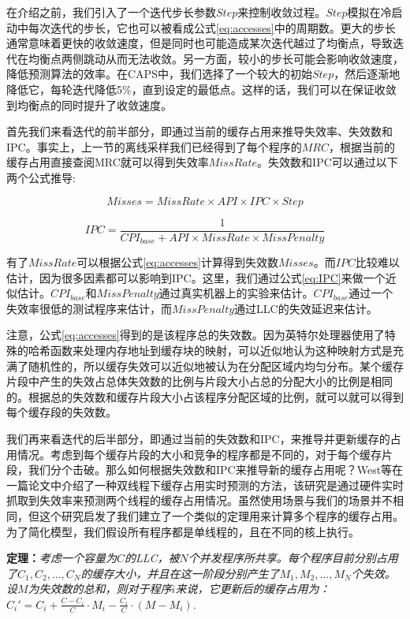 在介绍之前，我们引入了一个迭代步长参数$Step$来控制收敛过程。$Step$模拟在冷启动中每次迭代的步长，它也可以被看成公式\ref{eq:accesses}中的周期数。更大的步长通常意味着更快的收敛速度，但是同时也可能造成某次迭代越过了均衡点，导致迭代在均衡点两侧跳动从而无法收敛。另一方面，较小的步长可能会影响收敛速度，降低预测算法的效率。在CAPS中，我们选择了一个较大的初始$Step$，然后逐渐地降低它，每轮迭代降低5\%，直到设定的最低点。这样的话，我们可以在保证收敛到均衡点的同时提升了收敛速度。

首先我们来看迭代的前半部分，即通过当前的缓存占用来推导失效率、失效数和IPC。事实上，上一节的离线采样我们已经得到了每个程序的$MRC$，根据当前的缓存占用直接查阅MRC就可以得到失效率$MissRate$。失效数和IPC可以通过以下两个公式推导:

\begin{equation}
Misses = MissRate \times API \times IPC \times Step 
\label{eq:accesses}
\end{equation}

\begin{equation}
IPC = \frac{1}{CPI_{base} + API \times MissRate \times MissPenalty}
\label{eq:IPC}
\end{equation}

有了$MissRate$可以根据公式\ref{eq:accesses}计算得到失效数$Misses$。而$IPC$比较难以估计，因为很多因素都可以影响到IPC。这里，我们通过公式\ref{eq:IPC}来做一个近似估计。$CPI_{base}$和$MissPenalty$通过真实机器上的实验来估计。$CPI_{base}$通过一个失效率很低的测试程序来估计，而$MissPenalty$通过LLC的失效延迟来估计。   

注意，公式\ref{eq:accesses}得到的是该程序总的失效数。因为英特尔处理器使用了特殊的哈希函数来处理内存地址到缓存块的映射，可以近似地认为这种映射方式是充满了随机性的，所以缓存失效可以近似地被认为在分配区域内均匀分布。某个缓存片段中产生的失效占总体失效数的比例与片段大小占总的分配大小的比例是相同的。根据总的失效数和缓存片段大小占该程序分配区域的比例，就可以就可以得到每个缓存段的失效数。

我们再来看迭代的后半部分，即通过当前的失效数和IPC，来推导并更新缓存的占用情况。考虑到每个缓存片段的大小和竞争的程序都是不同的，对于每个缓存片段，我们分个击破。那么如何根据失效数和IPC来推导新的缓存占用呢？West等在一篇论文中介绍了一种双线程下缓存占用实时预测的方法\parencite{west2010online}，该研究是通过硬件实时抓取到失效率来预测两个线程的缓存占用情况。虽然使用场景与我们的场景并不相同，但这个研究启发了我们建立了一个类似的定理用来计算多个程序的缓存占用。为了简化模型，我们假设所有程序都是单线程的，且在不同的核上执行。

\textbf{定理：}\emph{考虑一个容量为$C$的LLC，被$N$个并发程序所共享。每个程序目前分别占用了$C_1, C_2, ... , C_N$的缓存大小，并且在这一阶段分别产生了$M_1, M_2, ... , M_N$个失效。设$M$为失效数的总和，则对于程序$i$来说，它更新后的缓存占用为：$C_i' = C_i + \frac{C-C_i}{C} \cdot M_i - \frac{C_i}{C} \cdot (M-M_i)$.}


